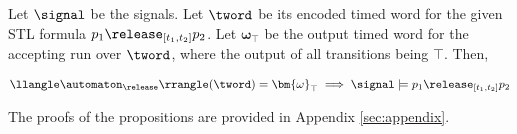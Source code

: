 \begin{proposition}   
\label{propo2}
    Let $\signal$ be the signals. Let $\tword$ be its encoded timed word for the given STL formula $p_1\release_{[t_1,t_2]}p_2$. %
    Let $\bm{\omega}_{\top}$ be the output timed word for the accepting run over $\tword$, where the output of all transitions being $\top$. Then,
        

        \begin{align*}
        \llangle\automaton_{\release}\rrangle(\tword) = \bm{\omega}_{\top} \implies \signal \models p_1 \release_{[t_1, t_2]} p_2
        \end{align*}
\end{proposition}





The proofs of the propositions are provided in Appendix \ref{sec:appendix}.